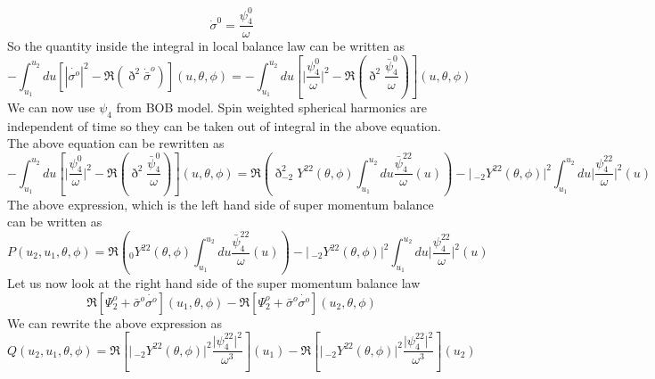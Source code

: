 \documentclass[prd,preprintnumbers,onecolumn,eqsecnum,floatfix,letter]{revtex4}
\begin{document}
\begin{equation}
	\dot{\sigma}^{0} = \frac{\psi_{4}^{0}}{\omega} 
\end{equation}
So the quantity inside the integral in local balance law can be written as
\begin{equation}
	-\int_{u_{1}}^{u_{2}} du \left[|\dot{\sigma^{o}}|^{2} - \Re\left(\eth^{2}\dot{\bar{\sigma}}^{o} \right) \right](u, \theta, \phi) = -\int_{u_{1}}^{u_{2}} du \left[\bigg|\frac{\psi_{4}^{0}}{\omega}\bigg|^{2} - \Re\left(\eth^{2}\frac{\bar{\psi}_{4}^{0}}{\omega} \right) \right](u, \theta, \phi)
\end{equation}
We can now use $\psi_{4}$ from BOB model. Spin weighted spherical harmonics are independent of time so they can be taken out of integral in the above equation. The above equation can be rewritten as 
\begin{equation}
	-\int_{u_{1}}^{u_{2}} du \left[\bigg|\frac{\psi_{4}^{0}}{\omega}\bigg|^{2} - \Re\left(\eth^{2}\frac{\bar{\psi}_{4}^{0}}{\omega} \right) \right](u, \theta, \phi) = \Re\left(\eth^2 _{-2}Y^{22}(\theta,\phi)\int_{u_{1}}^{u_{2}} du \frac{\bar{\psi}_{4}^{22}}{\omega}(u)\right) - \Bigg|\,_{-2}Y^{22}(\theta,\phi)\Bigg|^2\int_{u_{1}}^{u_{2}} du \bigg|\frac{\psi_{4}^{22}}{\omega}\bigg|^{2}(u)
\end{equation}
The above expression, which is the left hand side of super momentum balance can be written as
\begin{equation}
	P(u_2, u_1, \theta, \phi) =  \Re\left( _{0}Y^{22}(\theta,\phi)\int_{u_{1}}^{u_{2}} du \frac{\bar{\psi}_{4}^{22}}{\omega}(u)\right) - \Bigg|\,_{-2}Y^{22}(\theta,\phi)\Bigg|^2\int_{u_{1}}^{u_{2}} du \bigg|\frac{\psi_{4}^{22}}{\omega}\bigg|^{2}(u)
\end{equation} 
 Let us now look at the right hand side of the super momentum balance law
 \begin{equation}
 	\Re\left[\Psi^{o}_{2} + \bar{\sigma}^{o}\dot{\sigma^{o}}\right]\left(u_{1}, \theta, \phi\right) - \Re\left[\Psi^{o}_{2} + \bar{\sigma}^{o}\dot{\sigma^{o}}\right]\left(u_{2}, \theta, \phi\right) 
 \end{equation}
 We can rewrite the above expression as
 \begin{equation}
 	Q(u_2, u_1, \theta, \phi) = \Re\left[\bigg|\,_{-2}Y^{2 2}(\theta,\phi)\bigg|^{2} \frac{\big|\psi_{4}^{22}\big|^2}{\omega^3}\right]\left(u_{1}\right)- \Re\left[\bigg|\,_{-2}Y^{2 2}(\theta,\phi)\bigg|^{2} \frac{\big|\psi_{4}^{22}\big|^2}{\omega^3}\right]\left(u_{2}\right) 
 \end{equation}
\end{document}
